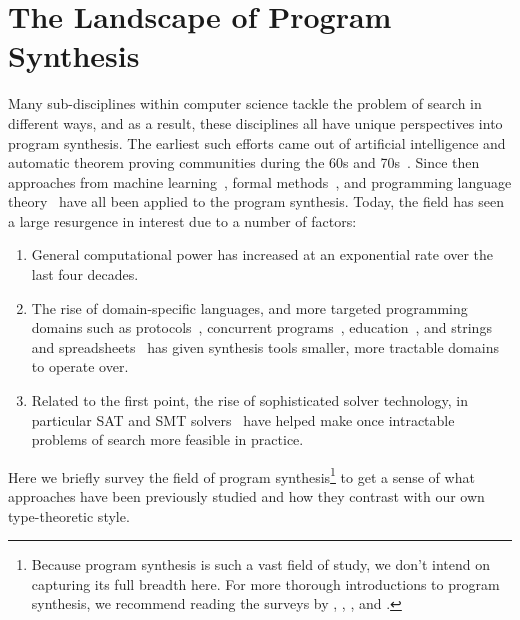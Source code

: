 \section{The Landscape of Program Synthesis}
\label{sec:the-landscape-of-program-synthesis}

Many sub-disciplines within computer science tackle the problem of search in different ways, and as a result, these disciplines all have unique perspectives into program synthesis.
The earliest such efforts came out of artificial intelligence and automatic theorem proving communities during the 60s and 70s~\citep{green-ijcai-1969, summers-popl-1976}.
Since then approaches from machine learning~\citep{lau-thesis-2001, briggs-kes-2008, weimer-icse-2009}, formal methods~\citep{srivastava-popl-2010, bodik-popl-2010, kuncak-pldi-2010}, and programming language theory~\citep{albarghouthi-cav-2013, gvero-pldi-2013, scherer-icfp-2015} have all been applied to the program synthesis.
Today, the field has seen a large resurgence in interest due to a number of factors:
\begin{enumerate}
  \item General computational power has increased at an exponential rate over the last four decades.~\citep{moore-electronics-1965}
  \item The rise of domain-specific languages, and more targeted programming domains such as protocols~\citep{alur-popl-2005, udupa-pldi-2013}, concurrent programs~\citep{solar-lezama-pldi-2008, cerny-cav-2011, prountzos-oopsla-2012}, education~\citep{singh-pldi-2013}, and strings and spreadsheets~\citep{gulwani-popl-2011} has given synthesis tools smaller, more tractable domains to operate over.
  \item Related to the first point, the rise of sophisticated solver technology, in particular SAT and SMT solvers~\citep{barrett-smt-2008} have helped make once intractable problems of search more feasible in practice.
\end{enumerate}
Here we briefly survey the field of program synthesis\footnote{%
  Because program synthesis is such a vast field of study, we don't intend on capturing its full breadth here.
  For more thorough introductions to program synthesis, we recommend reading the surveys by \citet{kreitz-automated-deduction-1998}, \citet{flener-jlp-1999}, \citet{gulwani-ppdp-2010}, and \citet{kitzelmann-aaip-2010}.
} to get a sense of what approaches have been previously studied and how they contrast with our own type-theoretic style.

